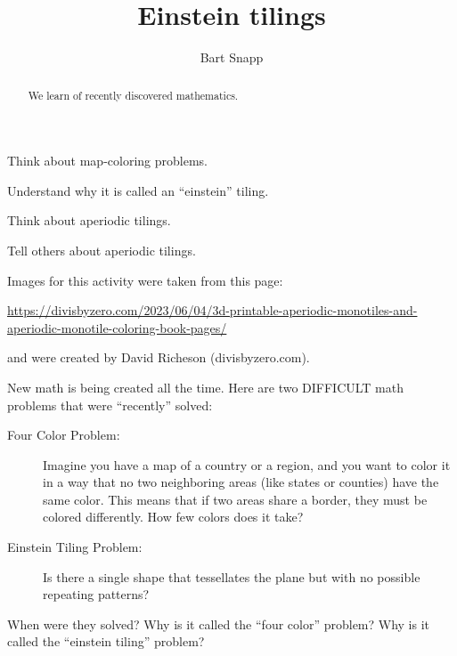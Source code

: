 \documentclass[noauthor,nooutcomes,handout,hints,12pt]{ximera}
\title{Einstein tilings}
\author{Bart Snapp}
\begin{document}
\begin{abstract}
  We learn of recently discovered mathematics.
\end{abstract}
\maketitle

\begin{listOutcomes}
  \item Think about map-coloring problems.
  \item Understand why it is called an ``einstein'' tiling.
  \item Think about aperiodic tilings.
  \item Tell others about aperiodic tilings.
\end{listOutcomes}
Images for this activity were taken from this page:
\begin{center}

  \url{https://divisbyzero.com/2023/06/04/3d-printable-aperiodic-monotiles-and-aperiodic-monotile-coloring-book-pages/}
\end{center}
and were created by David Richeson (divisbyzero.com).

\mynewpage

\begin{question}
  New math is being created all the time. Here are two DIFFICULT math
  problems that were ``recently'' solved:
  \begin{description}
    \item[Four Color Problem:] Imagine you have a map of a country or a
      region, and you want to color it in a way that no two neighboring
      areas (like states or counties) have the same color. This means
      that if two areas share a border, they must be colored
      differently. How few colors does it take?
    \item[Einstein Tiling Problem:] Is there a single shape that tessellates
      the plane but with no possible repeating patterns?
  \end{description}
  When were they solved? Why is it called the ``four color'' problem? Why is it
  called the ``einstein tiling'' problem?
\end{question}

\mynewpage
\end{document}
